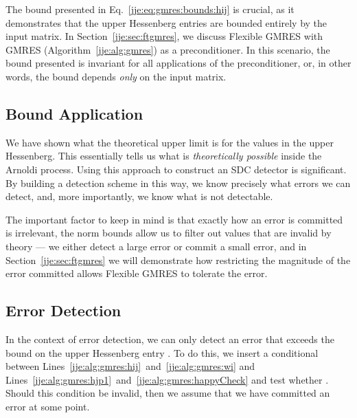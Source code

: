 The bound presented in Eq.~\eqref{jje:eq:gmres:bounds:hij} is crucial, as it
demonstrates that the upper Hessenberg entries are bounded entirely by the input
matrix. In Section~\ref{jje:sec:ftgmres}, we discuss Flexible GMRES
with GMRES (Algorithm~\ref{jje:alg:gmres}) as a preconditioner. In this
scenario, the bound presented is invariant for all applications of the
preconditioner, or, in other words, the bound depends \emph{only} on the input
matrix.
\subsection{Bound Application}


We have shown what the theoretical upper limit is for the values in the upper
Hessenberg. This essentially tells us what is \emph{theoretically possible}
inside the Arnoldi process. Using this approach to construct an
SDC detector is significant. By building a detection scheme in this way, we know
precisely what errors we can detect, and, more importantly, we know what is not
detectable. 

The important factor to keep in mind is that exactly how an error is
committed is irrelevant, the norm bounds allow us to filter out values
that are invalid by theory --- we either detect a
large error or commit a small error, and in Section~\ref{jje:sec:ftgmres} we
will demonstrate how restricting the magnitude of the error committed allows
Flexible GMRES to tolerate the error.



\subsection{Error Detection}


In the context of error detection, we can only detect an error that exceeds the
bound on the upper Hessenberg entry . To do this, we insert a
conditional between
Lines~\ref{jje:alg:gmres:hij}~and~\ref{jje:alg:gmres:wi} and 
Lines~\ref{jje:alg:gmres:hjp1}~and~\ref{jje:alg:gmres:happyCheck}
 and test
whether . Should this condition be invalid, then we assume that we have committed an error 
at some point.






